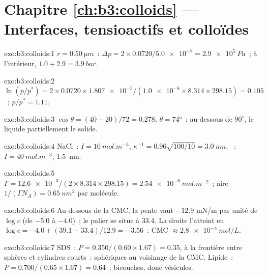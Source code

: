 \section*{Chapitre \ref{ch:b3:colloids} --- Interfaces, tensioactifs et colloïdes}

\begin{solution}{exo:b3:colloids:1}
$r = \qty{0.50}{\micro m}$~: $\Delta p = 2 \times 0.0720/\num{5.0e-7} = \qty{2.9e5}{Pa}$~; à l'intérieur, $1.0 + 2.9 = \qty{3.9}{bar}$.
\end{solution}

\begin{solution}{exo:b3:colloids:2}
$\ln(p/p^*) = 2 \times 0.0720 \times \num{1.807e-5}/(\num{1.0e-8} \times 8.314 \times 298.15) = 0.105$~; $p/p^* = 1.11$.
\end{solution}

\begin{solution}{exo:b3:colloids:3}
$\cos\theta = (40 - 20)/72 = 0.278$, $\theta = \ang{74}$~: au-dessous de
$90^\circ$, le liquide  partiellement le solide.
\end{solution}

\begin{solution}{exo:b3:colloids:4}
NaCl~: $I = \qty{10}{mol.m^{-3}}$, $\kappa^{-1} = 0.96\sqrt{100/10} = \qty{3.0}{nm}$. ~: $I = \qty{40}{mol.m^{-3}}$, \qty{1.5}{nm}.
\end{solution}

\begin{solution}{exo:b3:colloids:5}
$\Gamma = \num{12.6e-3}/(2 \times 8.314 \times 298.15) = \qty{2.54e-6}{mol.m^{-2}}$~; aire $1/(\Gamma N_A) =
\qty{0.65}{nm^2}$ par molécule.
\end{solution}

\begin{solution}{exo:b3:colloids:6}
Au-dessous de la CMC, la pente vaut $-12.9$ \unit{mN/m} par unité de
$\log c$ (de $-5.0$ à $-4.0$)~; le
palier se situe à 33.4. La droite l'atteint en $\log c = -4.0 + (39.1 - 33.4)/12.9 = -3.56$~:
CMC
$\approx \qty{2.8e-4}{mol/L}$.
\end{solution}

\begin{solution}{exo:b3:colloids:7}
SDS~: $P = 0.350/(0.60 \times 1.67) = 0.35$, à la frontière entre sphères
et cylindres courts~:  sphériques au voisinage de la CMC.
Lipide~: $P = 0.700/(0.65 \times 1.67) = 0.64$~:
bicouches, donc vésicules.
\end{solution}

